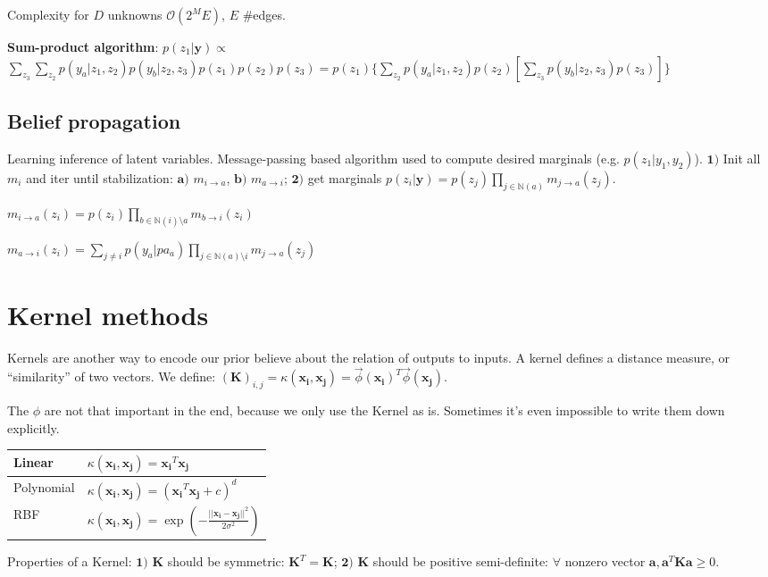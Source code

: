 \documentclass[10pt,a4paper,landscape]{article}
\renewcommand{\bf}[1]{\ensuremath{\mathbf{#1}}}
\begin{document}
\begin{multicols*}{4}
Complexity for $D$ unknowns $\mathcal{O}(2^M E)$, $E$ \#edges.

\textbf{Sum-product algorithm}: $p(z_1 | \bf{y}) \propto$
$\sum_{z_3} \sum_{z_2} p(y_a|z_1,z_2) p(y_b | z_2, z_3) p(z_1) p(z_2) p(z_3
) = p(z_1) \{ \sum_{z_2} p(y_a | z_1, z_2) p(z_2) [ \sum_{z_3} p(y_b | z_2, z_3) p(z_3) ] \}$

\subsection{Belief propagation}
Learning inference of latent variables. Message-passing based algorithm used to compute desired marginals (e.g. $p(z_1 | y_1, y_2)$). $\bf{1)}$ Init all $m_i$ and iter until stabilization: $\bf{a)}$ $m_{i \rightarrow a}$, $\bf{b)}$ $m_{a \rightarrow i}$; $\bf{2)}$ get marginals $p(z_i | \bf{y}) = p(z_j) \prod_{j \in \mathbb{N} (a)} m_{j \rightarrow a} (z_j)$.

$m_{i \rightarrow a}(z_i) = p(z_i) \prod_{b \in \mathbb{N}(i) \setminus a} m_{b \rightarrow i}(z_i) $

$m_{a \rightarrow i}(z_i) = \sum_{j \neq i} p(y_a | pa_a) \prod_{j \in \mathbb{N}(a) \setminus i } m_{j \rightarrow a}(z_j)$


\section{Kernel methods}
Kernels are another way to encode our prior believe about the relation of outputs to inputs. A kernel defines a distance measure, or ``similarity'' of two vectors. We define:
$(\bf{K})_{i,j} = \kappa(\bf{x_i}, \bf{x_j}) = \vec \phi(\bf{x_i})^T \vec \phi(\bf{x_j})$.

The $\phi$ are not that important in the end, because we only use the Kernel as is. Sometimes it's even impossible to write them down explicitly.

\begin{tabular}{ l | l }
  \hline
  Linear     & $\kappa(\bf{x_i}, \bf{x_j}) = \bf{x_i}^T \bf{x_j}$ \\
  \hline
  Polynomial & $\kappa(\bf{x_i}, \bf{x_j}) = (\bf{x_i}^T \bf{x_j} + c)^d$ \\
  \hline
  RBF        & $\kappa(\bf{x_i}, \bf{x_j}) = \exp\left(-\frac{||\bf{x_i} - \bf{x_j}||^2}{2\sigma^2}\right)$ \\
  \hline
\end{tabular}

Properties of a Kernel: $\bf{1)}$ $\bf{K}$ should be symmetric: $\bf{K}^T = \bf{K}$; $\bf{2)}$ $\bf{K}$ should be positive semi-definite: $\forall$ nonzero vector $\bf{a}, \bf{a}^T \bf{K} \bf{a} \geq 0$.


\end{multicols*}
\end{document}

